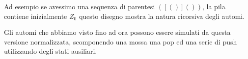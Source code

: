 \documentclass[12pt]{article}
\begin{document}
\begin{tcolorbox}
	Ad esempio se avessimo una sequenza di parentesi $([()]())$, la pila contiene inizialmente $Z_0$
	questo disegno mostra la natura ricorsiva degli automi.
\end{tcolorbox}

Gli automi che abbiamo visto fino ad ora possono essere simulati da questa versione normalizzata, scomponendo una mossa una pop ed una serie di push utilizzando degli stati ausiliari.
\end{document}
